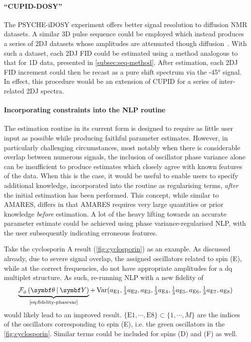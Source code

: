 \paragraph{``\ac{CUPID}-\ac{DOSY}''}
The \ac{PSYCHE}-i\ac{DOSY} experiment offers better signal resolution to
diffusion \ac{NMR} datasets.
A similar \ac{3D} pulse sequence could be employed
which instead produces a series of \ac{2DJ} datasets whose amplitudes are
attenuated though diffusion~\cite{Lucas2002,Cobas2004}. With such a dataset,
each \ac{2DJ} \ac{FID} could
be estimated using a method analogous to that for \ac{1D} data, presented in
\cref{subsec:seq-method}. After estimation, each \ac{2DJ} \ac{FID} increment
could then be recast as a pure shift spectrum via the \ang{-45} signal. In
effect, this procedure would be an extension of \ac{CUPID} for a series of
inter-related \ac{2DJ} spectra.

\paragraph{Incorporating constraints into the \ac{NLP} routine}
The estimation routine in its current form is designed to require as little
user input as possible while producing faithful parameter estimates. However,
in particularly challenging circumstances, most notably when
there is considerable overlap between numerous signals, the inclusion of
oscillator phase variance alone can be insufficient to produce estimates which
closely agree with known features of the data. When this is the case, it would
be useful to enable users to specify additional knowledge, incorporated into
the routine as regularising terms, \emph{after} the initial estimation has been
performed. This concept, while similar to \ac{AMARES}, differs
in that \ac{AMARES} requires very large quantities or prior knowledge
\emph{before} estimation. A lot of the heavy lifting towards an accurate
parameter estimate could be achieved using phase variance-regularised \ac{NLP},
with the user subsequently indicating erroneous features.

Take the cyclosporin A result (\cref{fig:cyclosporin}) as an example. As
discussed already, due to severe signal overlap, the assigned oscillators
related to spin (E), while at the correct frequencies, do not have appropriate
amplitudes for a dq multiplet structure. As such, re-running \ac{NLP} with a
new fidelity of
\[
    \underbrace{\FphithY}_{
        \text{\cref{eq:fidelity-phasevar}}
    }+ \Var(
        a_{\text{E}1},
        \tfrac{1}{3} a_{\text{E}2},
        a_{\text{E}3},
        \tfrac{1}{3} a_{\text{E}4},
        \tfrac{1}{3} a_{\text{E}5},
        a_{\text{E}6},
        \tfrac{1}{3} a_{\text{E}7},
        a_{\text{E}8}
    )
\]
would likely lead to an improved result.
$\lbrace \text{E}1, \cdots, \text{E}8 \rbrace \subset \lbrace 1, \cdots, M \rbrace$ are the
indices of the oscillators corresponding to spin (E), i.e. the green
oscillators in the \cref{fig:cyclosporin}. Similar terms could be included
for spins (D) and (F) as well.
